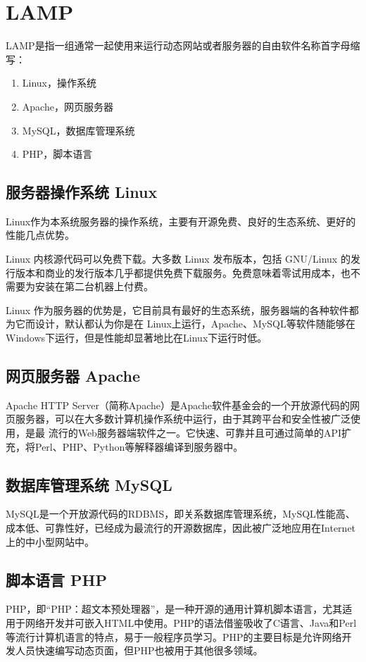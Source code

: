 \section{LAMP}

\label{lamp}
\gls{LAMP}是指一组通常一起使用来运行动态网站或者服务器的自由软件名称首字母缩写：

\begin{enumerate}
\item Linux，操作系统
\item Apache，网页服务器
\item MySQL，数据库管理系统
\item PHP，脚本语言
\end{enumerate}

\subsection{服务器操作系统 Linux}

Linux作为本系统服务器的操作系统，主要有开源免费、良好的生态系统、更好的性能几点优势。

Linux 内核源代码可以免费下载。大多数 Linux 发布版本，包括 GNU/Linux 的发行版本和商业的发行版本几乎都提供免费下载服务。免费意味着零试用成本，也不需要为安装在第二台机器上付费。

Linux 作为服务器的优势是，它目前具有最好的生态系统，服务器端的各种软件都为它而设计，默认都认为你是在 Linux上运行，Apache、MySQL等软件随能够在Windows下运行，但是性能却显著地比在Linux下运行时低。

\subsection{网页服务器 Apache}
Apache HTTP Server（简称Apache）是Apache软件基金会的一个开放源代码的网页服务器，可以在大多数计算机操作系统中运行，由于其跨平台和安全性被广泛使用，是最 流行的Web服务器端软件之一。它快速、可靠并且可通过简单的API扩充，将Perl、PHP、Python等解释器编译到服务器中。
\subsection{数据库管理系统 MySQL}
MySQL是一个开放源代码的\gls{RDBMS}，即关系数据库管理系统，MySQL性能高、成本低、可靠性好，已经成为最流行的开源数据库，因此被广泛地应用在Internet上的中小型网站中。
\subsection{脚本语言 PHP}
\gls{PHP}，即“PHP：超文本预处理器”，是一种开源的通用计算机脚本语言，尤其适用于网络开发并可嵌入HTML中使用。PHP的语法借鉴吸收了C语言、Java和Perl等流行计算机语言的特点，易于一般程序员学习。PHP的主要目标是允许网络开发人员快速编写动态页面，但PHP也被用于其他很多领域。
